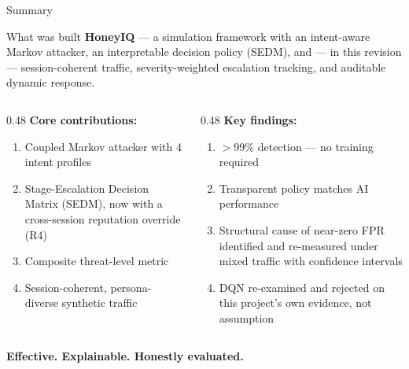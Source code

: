 \documentclass[aspectratio=169, 12pt]{beamer}
\begin{document}
\begin{frame}{Summary}
  \begin{block}{What was built}
    \textbf{HoneyIQ} --- a simulation framework with an intent-aware Markov attacker,
    an interpretable decision policy (SEDM), and --- in this revision ---
    session-coherent traffic, severity-weighted escalation tracking, and
    auditable dynamic response.
  \end{block}
  \vspace{0.3cm}
  \begin{columns}[T]
    \begin{column}{0.48\textwidth}
      \textbf{Core contributions:}
      \begin{enumerate}
        \item Coupled Markov attacker with 4 intent profiles
        \item Stage-Escalation Decision Matrix (SEDM), now with a
              cross-session reputation override (R4)
        \item Composite threat-level metric
        \item Session-coherent, persona-diverse synthetic traffic
      \end{enumerate}
    \end{column}
    \begin{column}{0.48\textwidth}
      \textbf{Key findings:}
      \begin{enumerate}
        \item $>$99\% detection --- no training required
        \item Transparent policy matches AI performance
        \item Structural cause of near-zero FPR identified and
              re-measured under mixed traffic with confidence intervals
        \item DQN re-examined and rejected on this project's own
              evidence, not assumption
      \end{enumerate}
    \end{column}
  \end{columns}
  \vspace{0.3cm}
  \begin{center}
    \large\textcolor{honeyblue}{\textbf{Effective. Explainable. Honestly evaluated.}}
  \end{center}
\end{frame}
\end{document}
